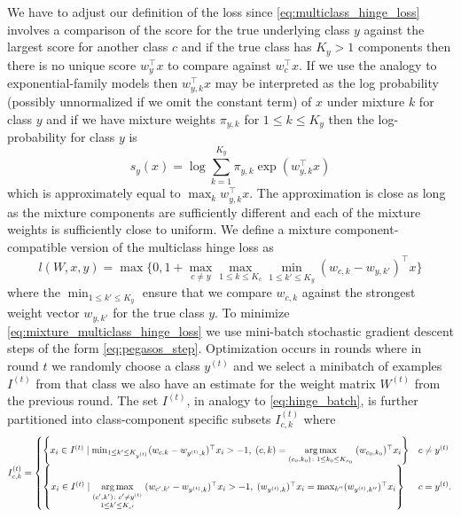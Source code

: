 \documentclass{article}
\begin{document}
We have to adjust our
definition of the loss since 
\autoref{eq:multiclass_hinge_loss} involves a comparison of
the score for the true underlying class $y$ against the largest score
for another class $c$ and if the true class has $K_y >1$ components
then there is no unique score $w_y^\top x$ to compare against $w_c^\top x$. If we use the analogy to exponential-family models then
$w_{y,k}^\top x$ may be interpreted as the log probability (possibly unnormalized if we omit the constant term) of $x$ under mixture
$k$ for class $y$
and if we have mixture weights
$\pi_{y,k}$ for $1\leq k\leq K_y$ then the log-probability for class
$y$ is
\begin{equation}
s_y(x) = \log \sum_{k=1}^{K_y} \pi_{y,k}\exp( w_{y,k}^\top x)
\end{equation}
which is approximately equal to $\max_{k} w_{y,k}^\top x$. The
approximation is close as long
as the mixture components are sufficiently different and each of
the mixture weights is sufficiently close to uniform.
We define a mixture component-compatible version
of the multiclass hinge loss as
\begin{equation}\label{eq:mixture_multiclass_hinge_loss}
l(W,x,y) = \max\{0,1+\max_{c\neq y}\max_{1\leq k\leq K_c}\min_{1\leq k'\leq K_y}(w_{c,k}- w_{y,k'})^\top x\}
\end{equation}
where the $\min_{1\leq k'\leq K_y}$ ensure that we compare $w_{c,k}$
against the strongest weight vector $w_{y,k'}$ for the true class
$y$.  To minimize \autoref{eq:mixture_multiclass_hinge_loss}
we use mini-batch stochastic gradient descent steps of the
form \autoref{eq:pegasos_step}.  Optimization occurs in rounds
where in round $t$ we randomly choose a class $y^{(t)}$ and we select
a minibatch of examples $I^{(t)}$ from that class we also have an estimate
for the weight matrix $W^{(t)}$ from the previous round. 
The set $I^{(t)}$, in analogy to \autoref{eq:hinge_batch}, is further
partitioned into class-component specific subsets
$I^{(t)}_{c,k}$ where
\begin{equation}\label{eq:hinge_component_batch}
I_{c,k}^{(t)} = \begin{cases}
\left\{ x_i \in I^{(t)}\mid \min_{1\leq k'\leq K_{y^{(t)}}}(w_{c,k} - w_{y^{(t)},k})^\top x_i > -1,\;(c,k)=\underset{(c_0,k_0) \colon 1\leq k_0\leq K_{c_0}}{\arg\max}\; (w_{c_0,k_0})^\top x_i\right\} & c\neq y^{(t)}\\
\left\{ x_i \in I^{(t)}\mid \underset{\begin{subarray}{c}
(c',k')\colon c'\neq y^{(t)}\\
1\leq k'\leq K_{c'}\end{subarray}}{\arg\max}\;(w_{c',k'} - w_{y^{(t)},k})^\top x_i > -1,\; (w_{y^{(t)},k})^\top x_i = \max_{k''} (w_{y^{(t)},k''})^\top x_i\right\} & c = y^{(t)}.
\end{cases}
\end{equation}
\end{document}
